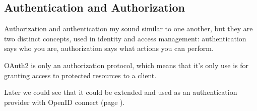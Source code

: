 \subsection{Authentication and Authorization}
Authorization and authentication my sound similar to one another, but they are
two distinct concepts, used in identity and access management:
authentication says who you are, authorization says what actions you can
perform.

OAuth2 is only an authorization protocol, which means that it's only use is for
granting access to protected resources to a client.

Later we could see that it could be extended and used as an authentication
provider with OpenID connect (page \pageref{openid}).
